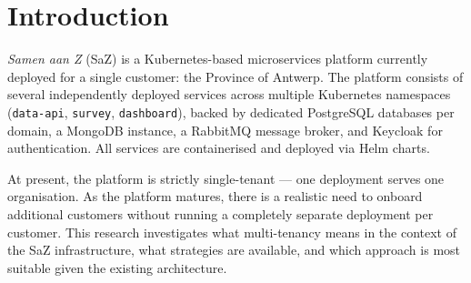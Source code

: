\chapter{Introduction}
\label{chapter:introduction}

\textit{Samen aan Z} (SaZ) is a Kubernetes-based microservices platform currently deployed for a single customer: the Province of Antwerp. The platform consists of several independently deployed services across multiple Kubernetes namespaces (\texttt{data-api}, \texttt{survey}, \texttt{dashboard}), backed by dedicated PostgreSQL databases per domain, a MongoDB instance, a RabbitMQ message broker, and Keycloak for authentication. All services are containerised and deployed via Helm charts.

At present, the platform is strictly single-tenant --- one deployment serves one organisation. As the platform matures, there is a realistic need to onboard additional customers without running a completely separate deployment per customer. This research investigates what multi-tenancy means in the context of the SaZ infrastructure, what strategies are available, and which approach is most suitable given the existing architecture.

